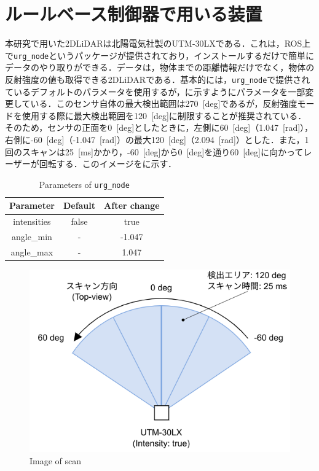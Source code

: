 
\section{ルールベース制御器で用いる装置}

  本研究で用いた2DLiDARは北陽電気社製のUTM-30LX\cite{hokuyo}である．これは，ROS上で\texttt{urg\_node}\cite{urg_node}というパッケージが提供されており，インストールするだけで簡単にデータのやり取りができる．データは，物体までの距離情報だけでなく，物体の反射強度の値も取得できる2DLiDARである．基本的には，\texttt{urg\_node}で提供されているデフォルトのパラメータを使用するが，に示すようにパラメータを一部変更している．このセンサ自体の最大検出範囲は270 \,[deg]であるが，反射強度モードを使用する際に最大検出範囲を120 \,[deg]に制限することが推奨されている\cite{urg_node}．そのため，センサの正面を0 \,[deg]としたときに，左側に60 \,[deg]（1.047 \,[rad]），右側に-60 \,[deg]（-1.047 \,[rad]）の最大120 \,[deg]（2.094 \,[rad]）とした．また，1回のスキャンは25 \,[ms]かかり，-60 \,[deg]から0 \,[deg]を通り60 \,[deg]に向かってレーザーが回転する．このイメージをに示す．

  \begin{table}[hbtp]
    \caption{Parameters of \texttt{urg\_node}}
    \label{tab:parameters_of_urg_node}
    \centering
    \begin{tabular}{|c|c|c|}
    \hline
    Parameter   & Default & After change \\ \hline
    intensities & false   & true         \\ \hline
    angle\_min  & -       & -1.047       \\ \hline
    angle\_max  & -       & 1.047        \\ \hline
    \end{tabular}
    \end{table}

    \begin{figure}[h]
      \centering
      \includegraphics[keepaspectratio, scale=0.40] {images/RobotGuidance_hokuyo_scan.png}
      \captionsetup{justification=raggedright} %
      \caption{Image of scan}
      \label{Fig:Image of scan}
    \end{figure}

\newpage